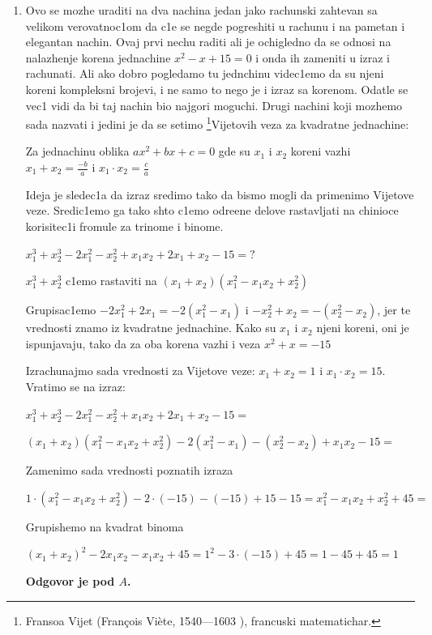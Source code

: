 \documentclass[a4paper,12pt]{article}
\newcommand{\Lat}{\fontencoding{OT1}\selectfont}
\begin{document}
\begin{enumerate}[1.]
\item Ovo se mozhe uraditi na dva nachina jedan jako rachunski zahtevan sa velikom verovatnoc1om da c1e se negde pogreshiti u rachunu i na pametan i elegantan nachin. Ovaj prvi nechu raditi ali je ochigledno da se odnosi na nalazhenje korena jednachine $x^2 - x + 15 = 0$ i onda ih zameniti u izraz i rachunati. Ali ako dobro pogledamo tu jednchinu videc1emo da su njeni koreni kompleksni brojevi, i ne samo to nego je i izraz sa korenom. Odatle se vec1 vidi da bi taj nachin bio najgori moguchi. Drugi nachini koji mozhemo sada nazvati i jedini je da se setimo \footnote{ Fransoa Vijet ({\Lat Fran\c{c}ois Vi\`{e}te, 1540---1603 }), francuski matematichar.}{Vijetovih} veza za kvadratne jednachine:
\par Za jednachinu oblika $ax^2 + bx + c = 0$ gde su $x_1$ i $x_2$ koreni vazhi $x_1 + x_2 = \frac{-b}{a}$ i $x_1 \cdot x_2 = \frac{c}{a}$
\par Ideja je sledec1a da izraz sredimo tako da bismo mogli da primenimo Vijetove veze. Sredic1emo ga tako shto c1emo odre\dj{}ene delove rastavljati na chinioce korisitec1i fromule za trinome i binome.
\par $x_1^3 + x_2^3 - 2x_1^2 - x_2^2 + x_1x_2 + 2x_1 + x_2 -15 = ?$
\par $x_1^3 + x_2^3$ c1emo rastaviti na $(x_1 + x_2)(x_1^2 -x_1x_2 + x_2^2 )$
\par Grupisac1emo $-2x_1^2 +2x_1 = -2(x_1^2 -x_1)$ i $-x_2^2 +x_2 = - (x_2^2 -x_2)$, jer te vrednosti znamo iz kvadratne jednachine. Kako su $x_1$ i $x_2$ njeni koreni, oni je ispunjavaju, tako da za oba korena vazhi i veza $x^2 + x = -15$
\par Izrachunajmo sada vrednosti za Vijetove veze: $x_1 + x_2 = 1$ i $x_1 \cdot x_2 = 15$. Vratimo se na izraz:
\par $x_1^3 + x_2^3 - 2x_1^2 - x_2^2 + x_1x_2 + 2x_1 + x_2 -15 = $
\par $(x_1 + x_2)(x_1^2 -x_1x_2 + x_2^2 ) -2(x_1^2 -x_1) - (x_2^2 -x_2) +x_1x_2 - 15=  $
\par Zamenimo sada vrednosti poznatih izraza
\par $ 1 \cdot(x_1^2 -x_1x_2 + x_2^2 ) -2 \cdot(-15) - (-15) +15 - 15 = x_1^2 -x_1x_2 + x_2^2 + 45 = $
\par Grupishemo na kvadrat binoma
\par $(x_1 + x_2)^2 - 2x_1x_2 - x_1x_2 + 45 = 1^2 -3 \cdot (-15) + 45 = 1 - 45 + 45 = 1$
\par \textbf{Odgovor je pod $A$.}


\end{enumerate}
\end{document}
